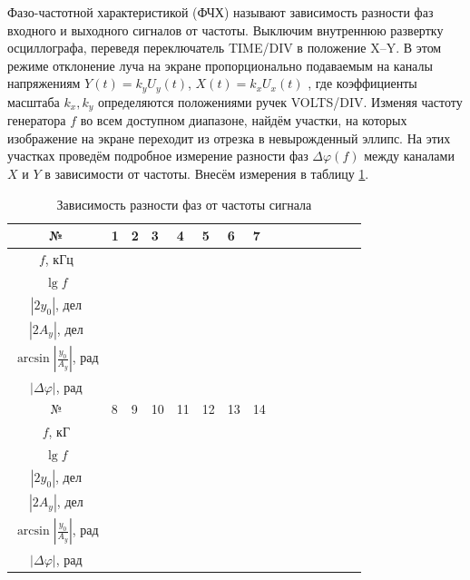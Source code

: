 \documentclass[a4paper,12pt]{article} %
\begin{document}
	Фазо-частотной характеристикой (ФЧХ) называют зависимость разности
	фаз входного и выходного сигналов от частоты.
	Выключим внутреннюю развертку осциллографа, переведя переключатель
	TIME/DIV в положение X–Y. В этом режиме отклонение луча на экране
	пропорционально подаваемым на каналы напряжениям $ Y\left(t\right)= k_yU_y\left(t\right) $,
	$ X\left(t\right) = k_xU_x\left(t\right) $ , где коэффициенты масштаба $ k_x, k_y $ определяются
	положениями ручек VOLTS/DIV. Изменяя частоту генератора $ f $ во всем
	доступном диапазоне, найдём участки, на которых изображение на экране
	переходит из отрезка в невырожденный эллипс. На этих участках проведём
	подробное измерение разности фаз $ \Delta \varphi\left(f\right) $ между каналами $ X $ и $ Y $ в
	зависимости от частоты. Внесём измерения в таблицу \ref{tab:fchkh}.
	
	\begin{table}[H]
		\centering
		\begin{tabular}{|c|p{1.2cm}|p{1.2cm}|p{1.2cm}|p{1.2cm}|p{1.2cm}|p{1.2cm}|p{1.2cm}| c|c|c|c|c|c|c|}
			\hline
			№ & 1 & 2 & 3 & 4 & 5 & 6 & 7 \\ \hline
			$ f $, кГц &  &  &  &  &  &  &  \\ \hline
			$ \lg f $ &  &  &  &  &  &  &  \\ \hline
			$ \left|2y_0\right| $, дел &  &  &  &  &  &  &  \\ \hline
			$ \left|2A_y\right| $, дел &  &  &  &  &  &  &  \\ \hline
			$ \arcsin\left|\frac{y_0}{A_y}\right| $, рад &  &  &  &  &  &  &  \\ \hline
			$ \left|\Delta\varphi\right| $, рад &  &  &  &  &  &  &  \\ \hline \hline
			№ & 8 & 9 & 10 & 11 & 12 & 13 & 14 \\ \hline
			$ f $, кГ &  &  &  &  &  &  &  \\ \hline
			$ \lg f $ &  &  &  &  &  &  &  \\ \hline
			$ \left|2y_0\right| $, дел &  &  &  &  &  &  &  \\ \hline
			$ \left|2A_y\right| $, дел &  &  &  &  &  &  &  \\ \hline
			$ \arcsin\left|\frac{y_0}{A_y}\right| $, рад &  &  &  &  &  &  &  \\ \hline
			$ \left|\Delta\varphi\right| $, рад &  &  &  &  &  &  &  \\ \hline 
		\end{tabular}
		\caption{Зависимость разности фаз от частоты сигнала}
		\label{tab:fchkh}
	\end{table}
	
\end{document}
